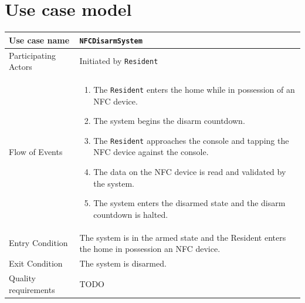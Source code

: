 \documentclass{report}
\begin{document}
\section{Use case model}

\newlength{\originalParindent}
\setlength{\originalParindent}{\parindent}
\newlength{\originalParskip}
\setlength{\originalParskip}{\parskip}
\parindent 0pt
\parskip 10pt

\begin{tabular}{| l | p{12cm} |}
\hline
Use case name & \texttt{NFCDisarmSystem} \\ \hline
Participating Actors & Initiated by \texttt{Resident} \\ \hline
Flow of Events & 

\begin{enumerate}
 \item The \texttt{Resident} enters the home while in possession of an NFC 
        device.
 \item The system begins the disarm countdown.
 \item The \texttt{Resident} approaches the console and tapping the NFC device
       against the console.
 \item The data on the NFC device is read and validated by the system.
 \item The system enters the disarmed state and the disarm countdown is halted.
\end{enumerate}

\\ \hline

Entry Condition & The system is in the armed state and the Resident enters the
home in possession an NFC device. \\ \hline

Exit Condition & The system is disarmed. \\ \hline
Quality requirements & TODO \\ \hline

\hline
\end{tabular}
\end{document}
